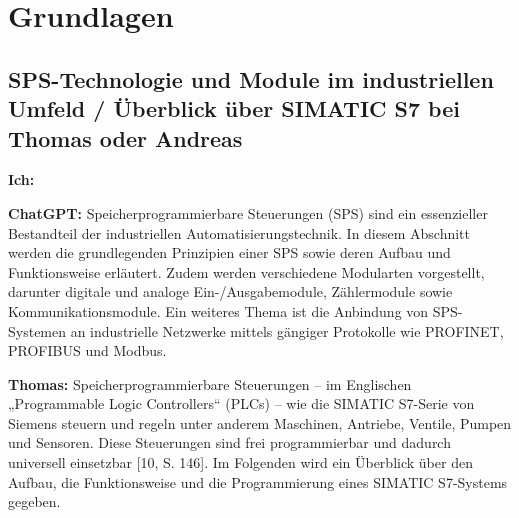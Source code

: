 \chapter{Grundlagen} 

\section{SPS-Technologie und Module im industriellen Umfeld /  Überblick über SIMATIC S7 bei Thomas oder Andreas}  
\textbf{Ich:}

\textbf{ChatGPT:}
Speicherprogrammierbare Steuerungen (SPS) sind ein essenzieller Bestandteil der industriellen Automatisierungstechnik. In diesem Abschnitt werden die grundlegenden Prinzipien einer SPS sowie deren Aufbau und Funktionsweise erläutert.  
Zudem werden verschiedene Modularten vorgestellt, darunter digitale und analoge Ein-/Ausgabemodule, Zählermodule sowie Kommunikationsmodule.  
Ein weiteres Thema ist die Anbindung von SPS-Systemen an industrielle Netzwerke mittels gängiger Protokolle wie PROFINET, PROFIBUS und Modbus.  

\textbf{Thomas:}
Speicherprogrammierbare Steuerungen – im Englischen „Programmable Logic Controllers“ 
(PLCs) – wie die SIMATIC S7-Serie von Siemens steuern und regeln unter anderem Maschinen, 
Antriebe, Ventile, Pumpen und Sensoren. Diese Steuerungen sind frei programmierbar und 
dadurch universell einsetzbar [10, S. 146]. Im Folgenden wird ein Überblick über den Aufbau, 
die Funktionsweise und die Programmierung eines SIMATIC S7-Systems gegeben.

